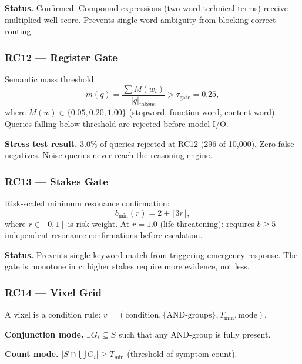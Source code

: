 \documentclass[11pt,twoside]{article}
\begin{document}
\begin{confirmedenv}
\textbf{Status.} Confirmed. Compound expressions (two-word technical terms) receive
multiplied well score. Prevents single-word ambiguity from blocking correct routing.
\end{confirmedenv}

\subsubsection{RC12 --- Register Gate}

Semantic mass threshold:
\[
  m(q) = \frac{\sum M(w_i)}{|q|_{\mathrm{tokens}}} > \tau_{\mathrm{gate}} = 0.25,
\]
where $M(w) \in \{0.05, 0.20, 1.00\}$ (stopword, function word, content word).
Queries falling below threshold are rejected before model I/O.

\begin{confirmedenv}
\textbf{Stress test result.} 3.0\% of queries rejected at RC12 (296 of 10,000).
Zero false negatives. Noise queries never reach the reasoning engine.
\end{confirmedenv}

\subsubsection{RC13 --- Stakes Gate}

Risk-scaled minimum resonance confirmation:
\[
  b_{\min}(r) = 2 + \lfloor 3r \rfloor,
\]
where $r \in [0,1]$ is risk weight. At $r=1.0$ (life-threatening): requires $b \geq 5$
independent resonance confirmations before escalation.

\begin{confirmedenv}
\textbf{Status.} Prevents single keyword match from triggering emergency response.
The gate is monotone in $r$: higher stakes require more evidence, not less.
\end{confirmedenv}

\subsubsection{RC14 --- Vixel Grid}

A vixel is a condition rule: $v = (\text{condition}, \{\text{AND-groups}\}, T_{\min}, \text{mode})$.

\textbf{Conjunction mode.} $\exists G_i \subseteq S$ such that any AND-group is fully present.

\textbf{Count mode.} $|S \cap \bigcup G_i| \geq T_{\min}$ (threshold of symptom count).
\end{document}
